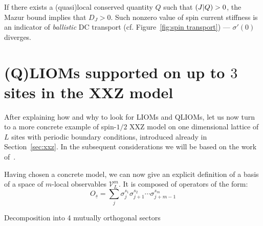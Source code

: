 If there exists a (quasi)local conserved quantity \(Q\) such that \(\left(J \middle| Q\right)>0\), the Mazur bound
implies that \(D_J > 0\). Such nonzero value of spin current stiffness is an indicator of \textit{ballistic}
DC transport (cf. Figure~\ref{fig:spin transport}) --- \(\sigma'(0)\) diverges.



\section{(Q)LIOMs supported on up to \(3\) sites in the XXZ model\label{sec:example}}

After explaining how and why to look for LIOMs and QLIOMs, let us now turn to a more concrete
example of spin-\(1/2\) XXZ model on one dimensional lattice of \(L\) sites with periodic
boundary conditions, introduced already in Section~\ref{sec:xxz}. In the subsequent
considerations we will be based on the work of~\textcite{Mierzejewski2015a}.

Having chosen a concrete model, we can now give an explicit definition of a basis
of a space of \(m\)-local observables \(\mathcal{V}_L^m\). It is composed of operators
of the form:
\begin{equation}
  O_{\underline{s}}=\sum_{j} \sigma_{j}^{s_{1}} \sigma_{j+1}^{s_{2}} \cdots \sigma_{j+m-1}^{s_{m}}
\end{equation}


Decomposition into 4 mutually orthogonal sectors
